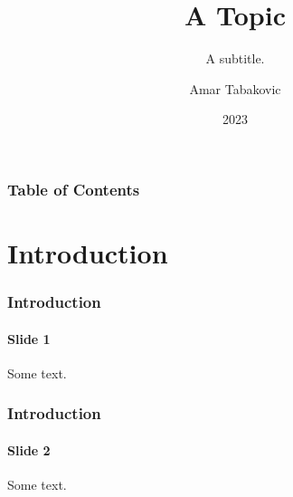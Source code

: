 \documentclass{beamer}
\author{Amar Tabakovic}
\title{A Topic}
\subtitle{A subtitle.}
\institute{Institution XYZ}
\date{2023}
\begin{document}
\frame{\titlepage}

\begin{frame}
\frametitle{Table of Contents}
\tableofcontents
\end{frame}

\section{Introduction}

\begin{frame}
\frametitle{Introduction}
\framesubtitle{Slide 1}
Some text.
\end{frame}

\begin{frame}
\frametitle{Introduction}
\framesubtitle{Slide 2}
Some text.
\end{frame}
\end{document}
